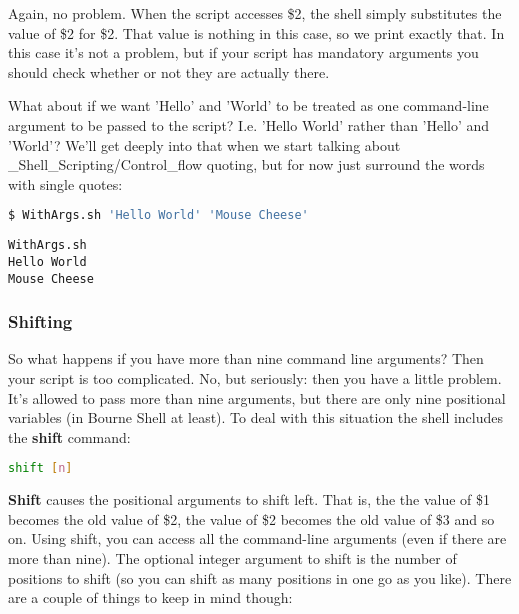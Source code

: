Again, no problem. When the script accesses \$2, the shell simply substitutes
the value of \$2 for \$2. That value is nothing in this case, so we print
exactly that. In this case it's not a problem, but if your script has mandatory
arguments you should check whether or not they are actually there.

What about if we want 'Hello' and 'World' to be treated as one command-line
argument to be passed to the script? I.e. 'Hello World' rather than 'Hello' and
'World'? We'll get deeply into that when we start talking about
\_Shell\_Scripting/Control\_flow quoting, but for now just surround the
words with single quotes:


\lstset{basicstyle=\scriptsize, numbers=left, captionpos=b, tabsize=4}
\begin{lstlisting}[caption=Calling the script with multi-word arguments,language={bash},
xleftmargin=15pt,label=lst:Calling the script with multi-word arguments]
$ WithArgs.sh 'Hello World' 'Mouse Cheese'
\end{lstlisting}
\scriptsize
\begin{verbatim}
WithArgs.sh
Hello World
Mouse Cheese
\end{verbatim}
\normalsize

\subsubsection{Shifting}
So what happens if you have more than nine command line arguments? Then your
script is too complicated. No, but seriously: then you have a little problem.
It's allowed to pass more than nine arguments, but there are only nine
positional variables (in Bourne Shell at least). To deal with this situation
the shell includes the \textbf{shift} command:

\lstset{basicstyle=\scriptsize, numbers=left, captionpos=b, tabsize=4}
\begin{lstlisting}[language={bash},xleftmargin=15pt]
shift [n]
\end{lstlisting}

\textbf{Shift} causes the positional arguments to shift left. That is, the
the value of \$1 becomes the old value of \$2, the value of \$2 becomes the old
value of \$3 and so on. Using shift, you can access all the command-line
arguments (even if there are more than nine). The optional integer argument to
shift is the number of positions to shift (so you can shift as many positions
in one go as you like). There are a couple of things to keep in mind though:

